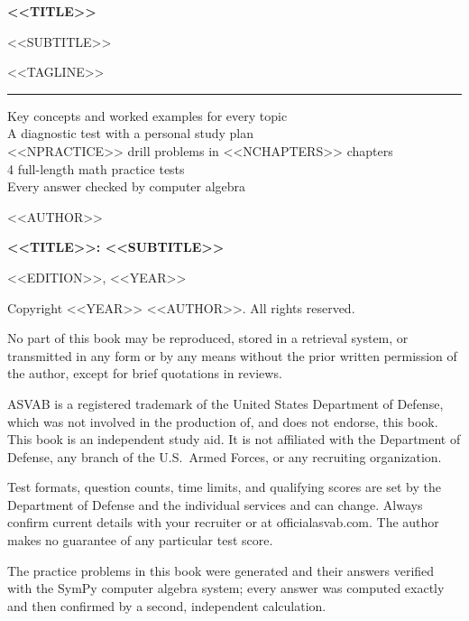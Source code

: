 \thispagestyle{empty}
\begin{center}
\vspace*{1.2in}
{\sans\bfseries\fontsize{40}{46}\selectfont <<TITLE>>\par}
\vspace{0.25in}
{\sans\fontsize{18}{24}\selectfont <<SUBTITLE>>\par}
\vspace{0.12in}
{\sans\large\color{mid}<<TAGLINE>>\par}
\vspace{0.5in}
{\color{ink}\rule{2.2in}{1.2pt}}\par
\vspace{0.5in}
\begin{minipage}{4.6in}\centering\large
Key concepts and worked examples for every topic\\[2pt]
A diagnostic test with a personal study plan\\[2pt]
<<NPRACTICE>> drill problems in <<NCHAPTERS>> chapters\\[2pt]
4 full-length math practice tests\\[2pt]
Every answer checked by computer algebra
\end{minipage}
\vfill
{\sans\Large <<AUTHOR>>\par}
\vspace{0.4in}
\end{center}
\clearpage

\thispagestyle{empty}
\vspace*{\fill}
{\small
\textbf{<<TITLE>>: <<SUBTITLE>>}\par
<<EDITION>>, <<YEAR>>\par
\medskip
Copyright \textcopyright{} <<YEAR>> <<AUTHOR>>. All rights reserved.\par
No part of this book may be reproduced, stored in a retrieval system, or
transmitted in any form or by any means without the prior written permission
of the author, except for brief quotations in reviews.\par
\medskip
ASVAB is a registered trademark of the United States Department of Defense,
which was not involved in the production of, and does not endorse, this book.
This book is an independent study aid. It is not affiliated with the
Department of Defense, any branch of the U.S.\ Armed Forces, or any
recruiting organization.\par
\medskip
Test formats, question counts, time limits, and qualifying scores are set by
the Department of Defense and the individual services and can change. Always
confirm current details with your recruiter or at officialasvab.com. The
author makes no guarantee of any particular test score.\par
\medskip
The practice problems in this book were generated and their answers verified
with the SymPy computer algebra system; every answer was computed exactly and
then confirmed by a second, independent calculation.\par
}
\clearpage

